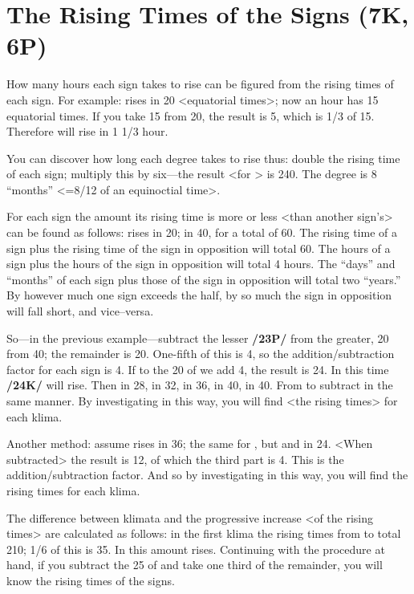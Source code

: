 \section{The Rising Times of the Signs (7K, 6P)}
How many hours each sign takes to rise can be figured from the rising times of each sign. For example: \Aries\xspace rises in 20 <equatorial times>; now an hour has 15 equatorial times. If you take 15 from 20, the result is 5, which is 1/3 of 15. Therefore \Aries\xspace will rise in 1 1/3 hour.

You can discover how long each degree takes to rise thus: double the rising time of each sign; multiply this by six—the result <for \Aries> is 240. The degree is 8 “months” <=8/12 of an equinoctial time>.

For each sign the amount its rising time is more or less <than another sign’s> can be found as follows: \Aries\xspace rises in 20; \Libra\xspace in 40, for a total of 60. The rising time of a sign plus the rising time of the sign in opposition will total 60. The hours of a sign plus the hours of the sign in opposition will total 4 hours. The “days” and “months” of each sign plus those of the sign in opposition will total two “years.” By however much one sign exceeds the half, by so much the sign in opposition will fall short, and vice–versa. 

So—in the previous example—subtract the lesser \textbf{/23P/} from the greater, 20 from 40; the remainder is 20. One-fifth of this is 4, so the addition/subtraction factor for each sign is 4. If to the 20 of \Aries\xspace we add 4, the result is 24. In this time \textbf{/24K/} \Taurus\xspace will rise. Then \Gemini\xspace in 28, \Cancer\xspace in 32, \Leo\xspace in 36, \Virgo\xspace in 40, \Libra\xspace in 40. From \Scorpio\xspace to \Pisces\xspace subtract in the same manner. By investigating in this way, you will find <the rising times> for each klima.

Another method: assume \Leo\xspace rises in 36; the same for \Scorpio, but \Taurus\xspace and \Aquarius\xspace in 24. <When subtracted> the result is 12, of which the third part is 4. This is the addition/subtraction factor. And so by investigating in this way, you will find the rising times for each klima.

The difference between klimata and the progressive increase <of the rising times> are calculated as follows: in the first klima the rising times from \Cancer\xspace to \Sagittarius\xspace total 210; 1/6 of this is 35. In this amount \Leo\xspace rises. Continuing with the procedure at hand, if you subtract the 25 of \Aquarius\xspace and take one third of the remainder, you will know the rising times of the signs.

